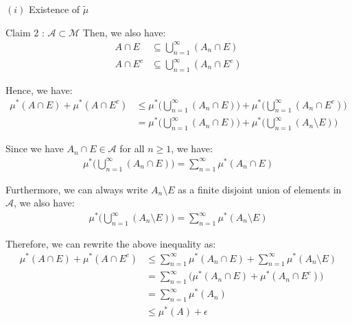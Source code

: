 \begin{proof*}
\begin{subproof}{$(i)$ Existence of $\tilde\mu$}
\begin{subproof}{\newline Claim 2 : $\mathcal{A} \subset \mathcal{M}$}
           \noindent\newline Then, we also have:
           \begin{align*}
               A \cap E &\subseteq \bigcup_{n=1}^\infty (A_n \cap E) \\
               A \cap E^c &\subseteq \bigcup_{n=1}^\infty (A_n \cap E^c)
           \end{align*}

           \noindent\newline Hence, we have:
           \begin{align*}
               \mu^*(A\cap E) + \mu^*(A\cap E^c) &\le \mu^*\Bigg( \bigcup_{n=1}^\infty (A_n \cap E) \Bigg) + \mu^*\Bigg( \bigcup_{n=1}^\infty (A_n \cap E^c) \Bigg) \\
               &= \mu^*\Bigg( \bigcup_{n=1}^\infty (A_n \cap E) \Bigg) + \mu^*\Bigg( \bigcup_{n=1}^\infty (A_n \setminus E) \Bigg)
           \end{align*}

           \noindent\newline Since we have $A_n\cap E \in \mathcal{A}$ for all $n\ge 1$, we have:
           \begin{align*}
               \mu^*\Bigg( \bigcup_{n=1}^\infty (A_n \cap E) \Bigg) = \sum_{n=1}^\infty \mu^*(A_n\cap E)
           \end{align*}

           \noindent\newline Furthermore, we can always write $A_n\setminus E$ as a finite disjoint union of elements in $\mathcal{A}$, we also have:
           \begin{align*}
               \mu^*\Bigg( \bigcup_{n=1}^\infty (A_n \setminus E) \Bigg) = \sum_{n=1}^\infty \mu^*(A_n\setminus E)
           \end{align*}

           \noindent\newline Therefore, we can rewrite the above inequality as:
           \begin{align*}
               \mu^*(A\cap E) + \mu^*(A\cap E^c) &\le \sum_{n=1}^\infty \mu^*(A_n\cap E) + \sum_{n=1}^\infty \mu^*(A_n\setminus E) \\
               &= \sum_{n=1}^\infty \Big( \mu^*(A_n\cap E) + \mu^*(A_n\cap E^c) \Big) \\
               &= \sum_{n=1}^\infty \mu^*(A_n) \\
               &\le \mu^*(A) + \epsilon
           \end{align*}


\end{subproof}
\end{subproof}
\end{proof*}
